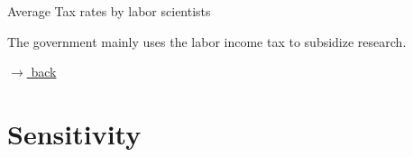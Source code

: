 \documentclass[11pt,aspectratio=169]{beamer}
\begin{document}
\begin{frame}{Average Tax rates by labor scientists}
\begin{figure}[h!!]
\end{figure}
\vspace{5mm}
\begin{block}{}
	The government mainly uses the labor income tax to subsidize research.
\end{block}	
\vspace{-4mm}
\hfill
\hyperlink{backOPT}{\tiny{$\rightarrow$ back}}

\end{frame}











\section*{Sensitivity}
\end{document}
